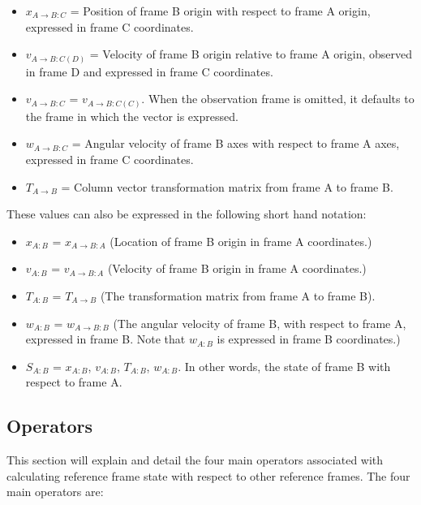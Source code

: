 \begin{itemize}

\item{$x_{A \rightarrow B:C}$}  = Position of frame B origin
with respect to frame A origin, expressed in frame C coordinates.
\item{$v_{A \rightarrow B:C(D)}$} = Velocity of frame B origin
relative to frame A origin, observed in frame D and expressed in frame C
coordinates.
\item{$v_{A \rightarrow B:C}$} = $v_{A \rightarrow B:C(C)}$.
When the observation frame is omitted, it defaults to the frame in which
the vector is expressed.
\item{$w_{A \rightarrow B:C}$}  = Angular velocity of frame B axes with respect
to frame A axes, expressed in frame C coordinates.
\item{$T_{A \rightarrow B}$}    = Column vector transformation
matrix from frame A to frame B.
\end{itemize}

These values can also be expressed in the following short hand notation:

\begin{itemize}
\item{$x_{A:B}$}     = $x_{A \rightarrow B:A}$ (Location of frame B
                                     origin in frame A coordinates.)
\item{$v_{A:B}$}     = $v_{A \rightarrow B:A}$ (Velocity of frame B origin in frame A
                                     coordinates.)
\item{$T_{A:B}$}     = $T_{A \rightarrow B}$ (The transformation matrix from frame A to
                                   frame B).
\item{$w_{A:B}$}     = $w_{A \rightarrow B:B}$ (The angular velocity of frame B, with
respect to frame A, expressed in frame B. Note that $w_{A:B}$ is
expressed in frame B coordinates.)

\item{$S_{A:B}$}     = {$x_{A:B}$, $v_{A:B}$, $T_{A:B}$, $w_{A:B}$}.
In other words, the state of frame B with respect to frame A.
\end{itemize}

\subsection{Operators}

This section will explain and detail the four main operators associated with
calculating reference frame state with respect to other reference frames. The
four main operators are:

